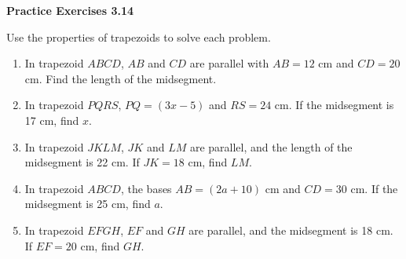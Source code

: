 \vspace{0.3ex}
\noindent\textbf{Practice Exercises 3.14}

\vspace{0.2ex}

Use the properties of trapezoids to solve each problem.

\begin{enumerate}[label=\color{blue}\arabic*.]
    \item In trapezoid \(ABCD\), \(AB\) and \(CD\) are parallel with \(AB = 12\) cm and \(CD = 20\) cm. Find the length of the midsegment.
    \item In trapezoid \(PQRS\), \(PQ = (3x - 5)\) and \(RS = 24\) cm. If the midsegment is 17 cm, find \(x\).
    \item In trapezoid \(JKLM\), \(JK\) and \(LM\) are parallel, and the length of the midsegment is 22 cm. If \(JK = 18\) cm, find \(LM\).
    \item In trapezoid \(ABCD\), the bases \(AB = (2a + 10)\) cm and \(CD = 30\) cm. If the midsegment is 25 cm, find \(a\).
    \item In trapezoid \(EFGH\), \(EF\) and \(GH\) are parallel, and the midsegment is 18 cm. If \(EF = 20\) cm, find \(GH\).
\end{enumerate}
